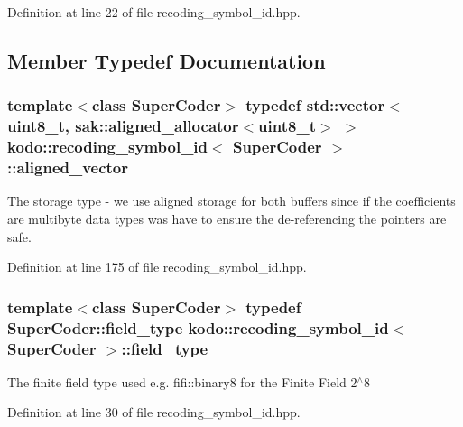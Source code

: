 Definition at line 22 of file recoding\-\_\-symbol\-\_\-id.\-hpp.



\subsection{Member Typedef Documentation}
\hypertarget{classkodo_1_1recoding__symbol__id_a12f113fed76cfaf960e79504c4c2f93c}{
\subsubsection[{aligned\-\_\-vector}]{\setlength{\rightskip}{0pt plus 5cm}template$<$class Super\-Coder$>$ typedef std\-::vector$<$uint8\-\_\-t, sak\-::aligned\-\_\-allocator$<$uint8\-\_\-t$>$ $>$ {\bf kodo\-::recoding\-\_\-symbol\-\_\-id}$<$ Super\-Coder $>$\-::{\bf aligned\-\_\-vector}\hspace{0.3cm}{\ttfamily [protected]}}}\label{classkodo_1_1recoding__symbol__id_a12f113fed76cfaf960e79504c4c2f93c}
The storage type -\/ we use aligned storage for both buffers since if the coefficients are multibyte data types was have to ensure the de-\/referencing the pointers are safe. 

Definition at line 175 of file recoding\-\_\-symbol\-\_\-id.\-hpp.

\hypertarget{classkodo_1_1recoding__symbol__id_a6b83353dedd55de580713f355e02a8cc}{
\subsubsection[{field\-\_\-type}]{\setlength{\rightskip}{0pt plus 5cm}template$<$class Super\-Coder$>$ typedef Super\-Coder\-::field\-\_\-type {\bf kodo\-::recoding\-\_\-symbol\-\_\-id}$<$ Super\-Coder $>$\-::{\bf field\-\_\-type}}}\label{classkodo_1_1recoding__symbol__id_a6b83353dedd55de580713f355e02a8cc}




The finite field type used e.\-g. fifi\-::binary8 for the Finite Field 2$^\wedge$8 

Definition at line 30 of file recoding\-\_\-symbol\-\_\-id.\-hpp.

